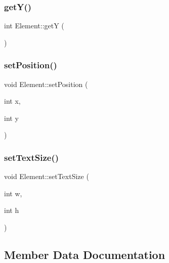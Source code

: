 \mbox{\label{classElement_aad10853bfba140e4ca5cab79d72f2d83}} 
\subsubsection{\texorpdfstring{get\+Y()}{getY()}}
{\footnotesize\ttfamily int Element\+::getY (\begin{DoxyParamCaption}{ }\end{DoxyParamCaption})}

\mbox{\label{classElement_a3f07a8ce2682d6bdd56db0ef3de858c0}} 
\subsubsection{\texorpdfstring{set\+Position()}{setPosition()}}
{\footnotesize\ttfamily void Element\+::set\+Position (\begin{DoxyParamCaption}\item[{int}]{x,  }\item[{int}]{y }\end{DoxyParamCaption})}

\mbox{\label{classElement_af3ad245bd04436524f8bd5c5835bf786}} 
\subsubsection{\texorpdfstring{set\+Text\+Size()}{setTextSize()}}
{\footnotesize\ttfamily void Element\+::set\+Text\+Size (\begin{DoxyParamCaption}\item[{int}]{w,  }\item[{int}]{h }\end{DoxyParamCaption})}



\subsection{Member Data Documentation}
\mbox{\label{classElement_a692cd0e79fb7323679a381556a58aaf8}} 
